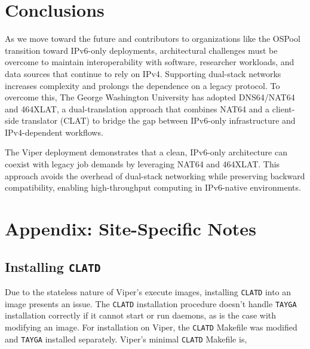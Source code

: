 \documentclass[11pt]{article}
\begin{document}
\section{Conclusions}


As we move toward the future and contributors to organizations like the OSPool transition toward IPv6-only deployments, architectural challenges must be overcome to maintain interoperability with software, researcher workloads, and data sources that continue to rely on IPv4. Supporting dual-stack networks increases complexity and prolongs the dependence on a legacy protocol. To overcome this, The George Washington University has adopted DNS64/NAT64 and 464XLAT, a dual-translation approach that combines NAT64 and a client-side translator (CLAT) to bridge the gap between IPv6-only infrastructure and IPv4-dependent workflows.

The Viper deployment demonstrates that a clean, IPv6-only architecture can coexist with legacy job demands by leveraging NAT64 and 464XLAT. This approach avoids the overhead of dual-stack networking while preserving backward compatibility, enabling high-throughput computing in IPv6-native environments.

\section{Appendix: Site-Specific Notes}
\subsection{Installing \texttt{CLATD}}
Due to the stateless nature of Viper's execute images, installing \texttt{CLATD} into an image presents an issue. The \texttt{CLATD} installation procedure doesn't handle \texttt{TAYGA} installation correctly if it cannot start or run daemons, as is the case with modifying an image.  For installation on Viper,  the \texttt{CLATD} Makefile was modified and \texttt{TAYGA} installed separately.  Viper's minimal \texttt{CLATD} Makefile is,
\end{document}
